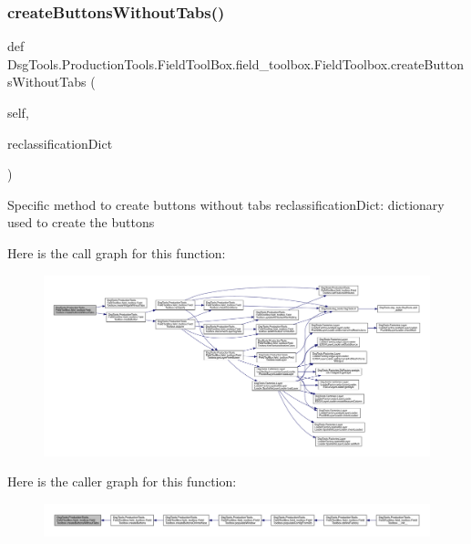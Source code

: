 \subsubsection{\texorpdfstring{create\+Buttons\+Without\+Tabs()}{createButtonsWithoutTabs()}}
{\footnotesize\ttfamily def Dsg\+Tools.\+Production\+Tools.\+Field\+Tool\+Box.\+field\+\_\+toolbox.\+Field\+Toolbox.\+create\+Buttons\+Without\+Tabs (\begin{DoxyParamCaption}\item[{}]{self,  }\item[{}]{reclassification\+Dict }\end{DoxyParamCaption})}

\begin{DoxyVerb}Specific method to create buttons without tabs
reclassificationDict: dictionary used to create the buttons
\end{DoxyVerb}
 Here is the call graph for this function\+:
\nopagebreak
\begin{figure}[H]
\begin{center}
\leavevmode
\includegraphics[width=350pt]{class_dsg_tools_1_1_production_tools_1_1_field_tool_box_1_1field__toolbox_1_1_field_toolbox_a5feea2b516215abe47448667836e1211_cgraph}
\end{center}
\end{figure}
Here is the caller graph for this function\+:
\nopagebreak
\begin{figure}[H]
\begin{center}
\leavevmode
\includegraphics[width=350pt]{class_dsg_tools_1_1_production_tools_1_1_field_tool_box_1_1field__toolbox_1_1_field_toolbox_a5feea2b516215abe47448667836e1211_icgraph}
\end{center}
\end{figure}
\mbox{\label{class_dsg_tools_1_1_production_tools_1_1_field_tool_box_1_1field__toolbox_1_1_field_toolbox_a889ff53bda2fc377700f108eef3a6cb6}} 
